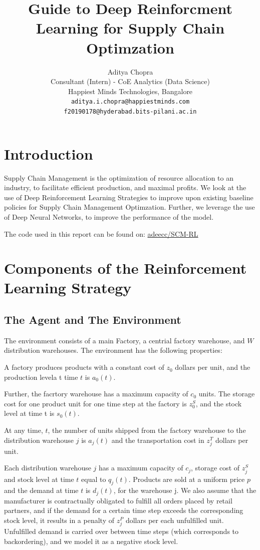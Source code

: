 \documentclass{article}
\title{Guide to Deep Reinforcment Learning for Supply Chain Optimzation}
\author{ {Aditya Chopra} \\
	Consultant (Intern) - CoE Analytics (Data Science) \\
	Happiest Minds Technologies, Bangalore \\
	\texttt{aditya.i.chopra@happiestminds.com} \\
	\texttt{f20190178@hyderabad.bits-pilani.ac.in}
}
\begin{document}
\maketitle

\section{Introduction}

Supply Chain Management is the optimization of resource allocation to an industry, to facilitate efficient production, and maximal profits. We look at the use of Deep Reinforcement Learning Strategies to improve upon existing baseline policies for Supply Chain Management Optimzation. Further, we leverage the use of Deep Neural Networks, to improve the performance of the model.

The code used in this report can be found on: \href{https://github.com/adeecc/SCM-RL}{adeecc/SCM-RL}





\section{Components of the Reinforcement Learning Strategy}

\subsection{The Agent and The Environment}
The environment consists of a main Factory, a centrial factory warehouse, and $W$ distribution warehouses. The environment has the following properties:

A factory produces products with a constant cost of $z_0$ dollars per unit, and the production levela t time $t$ is $a_0(t).$ 

Further, the facrtory warehouse has a maximum capacity of $c_0$ units. The storage cost for one product unit for one time step at the factory is $z_0^S$, and the stock level at time t is $s_0(t)$.

At any time, $t$, the number of units shipped from the factory warehouse to the distribution warehouse $j$ is $a_j(t)$ and the transportation cost in $z_j^T$ dollars per unit. 

Each distribution warehouse $j$ has a maximum capacity of $c_j$, storage cost of $z_j^S$ and stock level at time $t$ equal to $q_j(t)$. Products are sold at a uniform price $p$ and the demand at time $t$ is $d_j(t)$, for the warehouse j. We also assume that the manufacturer is contractually obligated to fulfill all orders placed by retail partners, and if the demand for a certain time step exceeds the corresponding stock level, it results in a penalty of $z_j^P$ dollars per each unfulfilled unit. Unfulfilled demand is carried over between time steps (which corresponds to backordering), and we model it as a negative stock level.
\end{document}
